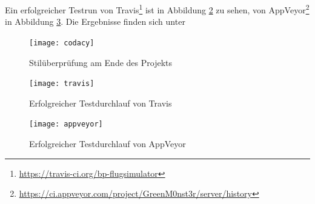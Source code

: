 Ein erfolgreicher Testrun von Travis\footnote{\url{https://travis-ci.org/bp-flugsimulator}} ist in Abbildung \ref{travis_png} zu sehen, von AppVeyor\footnote{\url{https://ci.appveyor.com/project/GreenM0nst3r/server/history}} in Abbildung \ref{appveyor_png}.
Die Ergebnisse finden sich unter 


\begin{figure}[t]
	\centering
\texttt{[image: codacy]}
	\caption{Stilüberprüfung am Ende des Projekts}
	\label{codacy_png}
\end{figure}

\begin{figure}[h]
	\centering
\texttt{[image: travis]}
	\caption{Erfolgreicher Testdurchlauf von Travis}
	\label{travis_png}
\end{figure}

\begin{figure}[h]
	\centering
\texttt{[image: appveyor]}
	\caption{Erfolgreicher Testdurchlauf von AppVeyor}
	\label{appveyor_png}
\end{figure}
